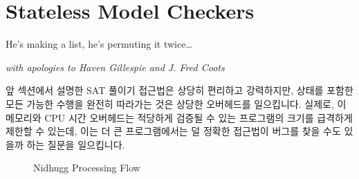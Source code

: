 
\section{Stateless Model Checkers}
\label{sec:formal:Stateless Model Checkers}
%
\epigraph{He's making a list, he's permuting it twice\dots}
	{\emph{with apologies to Haven Gillespie and J. Fred Coots}}

앞 섹션에서 설명한 SAT 풀이기 접근법은 상당히 편리하고 강력하지만, 상태를
포함한 모든 가능한 수행을 완전히 따라가는 것은 상당한 오버헤드를 일으킵니다.
실제로, 이 메모리와 CPU 시간 오버헤드는 적당하게 검증될 수 있는 프로그램의
크기를 급격하게 제한할 수 있는데, 이는 더 큰 프로그램에서는 덜 정확한 접근법이
버그를 찾을 수도 있을까 하는 질문을 일으킵니다.

\begin{figure}[tbp]
\centering
{}
\caption{Nidhugg Processing Flow}
\label{fig:formal:Nidhugg Processing Flow}
\end{figure}

